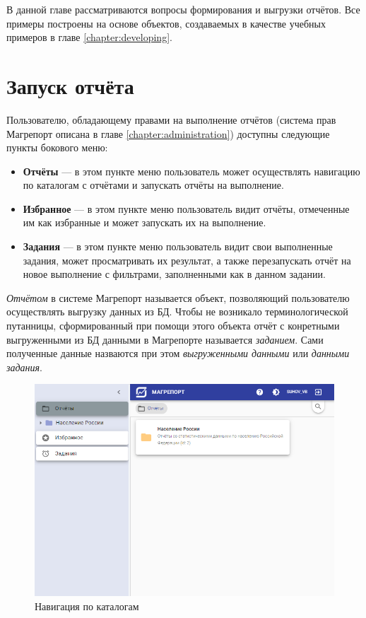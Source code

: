 \documentclass[../user-manual.tex]{subfiles}
\begin{document}
	
	В данной главе рассматриваются вопросы формирования и выгрузки отчётов. Все примеры построены на основе объектов, создаваемых в качестве учебных примеров в главе \ref{chapter:developing}.
	
	\section{Запуск отчёта}
	
	Пользователю, обладающему правами на выполнение отчётов (система прав Магрепорт описана в главе \ref{chapter:administration}) доступны следующие пункты бокового меню:
	\begin{itemize}
		\item \textbf{Отчёты} --- в этом пункте меню пользователь может осуществлять навигацию по каталогам с отчётами и запускать отчёты на выполнение.
		
		\item \textbf{Избранное} --- в этом пункте меню пользователь видит отчёты, отмеченные им как избранные и может запускать их на выполнение.
		
		\item \textbf{Задания} --- в этом пункте меню пользователь видит свои выполненные задания, может просматривать их результат, а также перезапускать отчёт на новое выполнение с фильтрами, заполненными как в данном задании.
	\end{itemize}


	\begin{NB}
		\textit{Отчётом} в системе Магрепорт называется объект, позволяющий пользователю осуществлять выгрузку данных из БД. Чтобы не возникало терминологической путанницы, сформированный при помощи этого объекта отчёт с конретными выгруженными из БД данными в Магрепорте называется \textit{заданием}. Сами полученные данные назваются при этом \textit{выгруженными данными} или \textit{данными задания}.
	\end{NB}
	
	
	\begin{figure}[h]
		\centering
		\includegraphics[width=\graphicswidth]{img/1-folders.png}
		\caption{Навигация по каталогам}
		\label{fig:folders}
	\end{figure}
	
\end{document}
